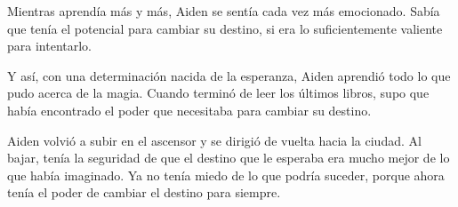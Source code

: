 Mientras aprendía más y más, Aiden se sentía cada vez más emocionado. Sabía que tenía el potencial para cambiar su destino, si era lo suficientemente valiente para intentarlo.

Y así, con una determinación nacida de la esperanza, Aiden aprendió todo lo que pudo acerca de la magia. Cuando terminó de leer los últimos libros, supo que había encontrado el poder que necesitaba para cambiar su destino.

Aiden volvió a subir en el ascensor y se dirigió de vuelta hacia la ciudad. Al bajar, tenía la seguridad de que el destino que le esperaba era mucho mejor de lo que había imaginado. Ya no tenía miedo de lo que podría suceder, porque ahora tenía el poder de cambiar el destino para siempre.
